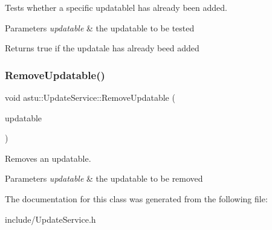 Tests whether a specific updatablel has already been added.


\begin{DoxyParams}{Parameters}
{\em updatable} & the updatable to be tested \\
\hline
\end{DoxyParams}
\begin{DoxyReturn}{Returns}
{\ttfamily true} if the updatale has already beed added 
\end{DoxyReturn}
\mbox{\label{classastu_1_1UpdateService_a04911354dbfbf3849fafda10209710b6}} 
\subsubsection{\texorpdfstring{Remove\+Updatable()}{RemoveUpdatable()}}
{\footnotesize\ttfamily void astu\+::\+Update\+Service\+::\+Remove\+Updatable (\begin{DoxyParamCaption}\item[{std\+::shared\+\_\+ptr$<$ \hyperlink{classastu_1_1IUpdatable}{I\+Updatable} $>$}]{updatable }\end{DoxyParamCaption})}

Removes an updatable.


\begin{DoxyParams}{Parameters}
{\em updatable} & the updatable to be removed \\
\hline
\end{DoxyParams}


The documentation for this class was generated from the following file\+:\begin{DoxyCompactItemize}
\item 
include/Update\+Service.\+h\end{DoxyCompactItemize}
